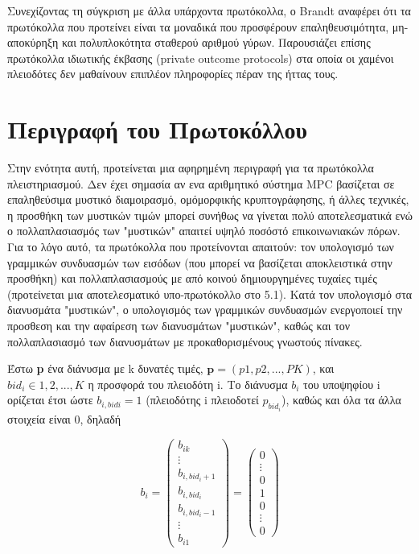 \documentclass[letterpaper,11pt]{article}
\begin{document}
	Συνεχίζοντας τη σύγκριση με άλλα υπάρχοντα πρωτόκολλα, ο Brandt αναφέρει ότι τα πρωτόκολλα που προτείνει είναι τα
	μοναδικά που προσφέρουν επαληθευσιμότητα, μη-αποκύρηξη και πολυπλοκότητα σταθερού αριθμού γύρων. Παρουσιάζει επίσης πρωτόκολλα
	ιδιωτικής έκβασης (private outcome protocols) στα οποία οι χαμένοι πλειοδότες δεν μαθαίνουν επιπλέον πληροφορίες πέραν της
	ήττας τους.
	
\section{Περιγραφή του Πρωτοκόλλου}

Στην ενότητα αυτή, προτείνεται μια αφηρημένη περιγραφή για τα πρωτόκολλα πλειστηριασμού. Δεν έχει σημασία αν ενα αριθμητικό σύστημα MPC βασίζεται
σε επαληθεύσιμα μυστικό διαμοιρασμό, ομόμορφικής κρυπτογράφησης, ή άλλες τεχνικές, η προσθήκη των μυστικών τιμών μπορεί συνήθως να γίνεται πολύ
αποτελεσματικά ενώ ο πολλαπλασιασμός των "μυστικών" απαιτεί υψηλό ποσόστό επικοινωνιακών πόρων. Για το λόγο αυτό, τα πρωτόκολλα που προτείνονται
απαιτούν: τον υπολογισμό των γραμμικών συνδυασμών των εισόδων (που μπορεί να βασίζεται αποκλειστικά στην προσθήκη) και πολλαπλασιασμούς με από
κοινού δημιουργημένες τυχαίες τιμές (προτείνεται μια αποτελεσματικό υπο-πρωτόκολλο στο 5.1). Κατά τον υπολογισμό στα διανυσμάτα "μυστικών", ο
υπολογισμός των γραμμικών συνδυασμών ενεργοποιεί την προσθεση και την αφαίρεση των διανυσμάτων "μυστικών", καθώς και τον πολλαπλασιασμό των
διανυσμάτων με προκαθορισμένους γνωστούς πίνακες.

Έστω \textbf{p} ένα διάνυσμα με k δυνατές τιμές, $\textbf{p}=(p1,p2,...,PK)$, και $bid_i \in {1, 2,. . . , K}$ η προσφορά του πλειοδότη i. Το
διάνυσμα $b_i$ του υποψηφίου i ορίζεται έτσι ώστε $b_{i,bidi}=1$ (πλειοδότης i πλειοδοτεί $p_{bid_i}$), καθώς και όλα τα άλλα στοιχεία είναι 0,
δηλαδή

\begin{displaymath}
	b_i = 
	\left ( \begin{array}{c}
		b_{ik}	\\
		\vdots	\\
		b_{i,bid_i+1} \\
		b_{i,bid_i}	\\
		b_{i,bid_i-1} \\
		\vdots \\
		b_{i1}
	\end{array} \right)
	=
	\left ( \begin{array}{c}
	0	\\
	\vdots \\
	0 \\
	1 \\
	0 \\
	\vdots \\
	0
	\end{array} \right)
\end{displaymath}
\end{document}
